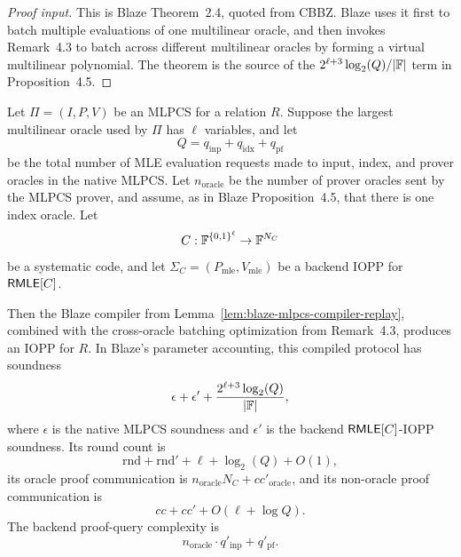 \begin{proof}[Proof input]
This is Blaze Theorem~2.4, quoted from CBBZ.  Blaze uses it first to batch
multiple evaluations of one multilinear oracle, and then invokes
Remark~4.3 to batch across different multilinear oracles by forming a virtual
multilinear polynomial.  The theorem is the source of the
\(2^{\ell+3}\log_2(Q)/|\mathbb{F}|\) term in Proposition~4.5.
\end{proof}

\begin{proposition}
\label{prop:blaze-batched-compiler-replay}
Let \(\Pi=(I,P,V)\) be an MLPCS for a relation \(R\).  Suppose the largest
multilinear oracle used by \(\Pi\) has \(\ell\) variables, and let
\[
  Q=q_{\mathrm{inp}}+q_{\mathrm{idx}}+q_{\mathrm{pf}}
\]
be the total number of MLE evaluation requests made to input, index, and prover
oracles in the native MLPCS.  Let \(n_{\mathrm{oracle}}\) be the number of
prover oracles sent by the MLPCS prover, and assume, as in Blaze
Proposition~4.5, that there is one index oracle.  Let
\[
  C:\mathbb{F}^{\{0,1\}^\ell}\to\mathbb{F}^{N_C}
\]
be a systematic code, and let \(\Sigma_C=(P_{\mathrm{mle}},V_{\mathrm{mle}})\)
be a backend IOPP for \(\mathsf{RMLE}[C]\).

Then the Blaze compiler from Lemma~\ref{lem:blaze-mlpcs-compiler-replay},
combined with the cross-oracle batching optimization from Remark~4.3, produces
an IOPP for \(R\).  In Blaze's parameter accounting, this compiled protocol has
soundness
\[
  \epsilon+\epsilon'
  +
  \frac{2^{\ell+3}\log_2(Q)}{|\mathbb{F}|},
\]
where \(\epsilon\) is the native MLPCS soundness and \(\epsilon'\) is the
backend \(\mathsf{RMLE}[C]\)-IOPP soundness.  Its round count is
\[
  \mathrm{rnd}+\mathrm{rnd}'+\ell+\log_2(Q)+O(1),
\]
its oracle proof communication is \(n_{\mathrm{oracle}}N_C+
cc'_{\mathrm{oracle}}\), and its non-oracle proof communication is
\[
  cc+cc'+O(\ell+\log Q).
\]
The backend proof-query complexity is
\[
  n_{\mathrm{oracle}}\cdot q'_{\mathrm{inp}}+q'_{\mathrm{pf}}.
\]
\end{proposition}

